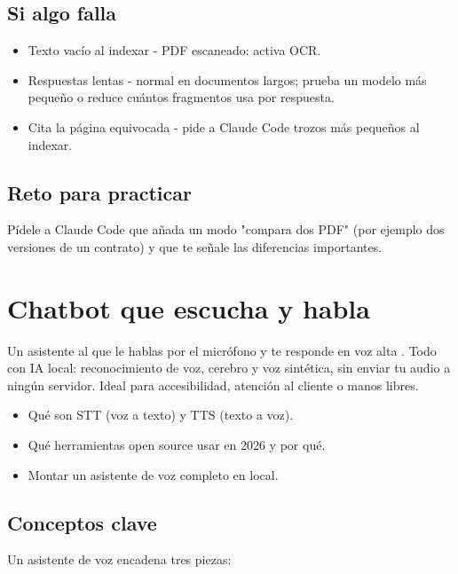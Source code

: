 \documentclass[11pt,a4paper]{book}
\begin{document}
\section{Si algo falla}
\begin{itemize}\item Texto vacío al indexar - PDF escaneado: activa OCR.\end{itemize}
\begin{itemize}\item Respuestas lentas - normal en documentos largos; prueba un modelo más pequeño o reduce cuántos fragmentos usa por respuesta.\end{itemize}
\begin{itemize}\item Cita la página equivocada - pide a Claude Code trozos más pequeños al indexar.\end{itemize}
\section{Reto para practicar}
Pídele a Claude Code que añada un modo "compara dos PDF" (por ejemplo dos versiones de un contrato) y que te señale las diferencias importantes.

\chapter{Chatbot que escucha y habla}
Un asistente al que le hablas por el micrófono y te responde en voz alta . Todo con IA local: reconocimiento de voz, cerebro y voz sintética, sin enviar tu audio a ningún servidor. Ideal para accesibilidad, atención al cliente o manos libres.

\begin{itemize}\item Qué son STT (voz a texto) y TTS (texto a voz).\end{itemize}
\begin{itemize}\item Qué herramientas open source usar en 2026 y por qué.\end{itemize}
\begin{itemize}\item Montar un asistente de voz completo en local.\end{itemize}
\section{Conceptos clave}
Un asistente de voz encadena tres piezas:
\end{document}
